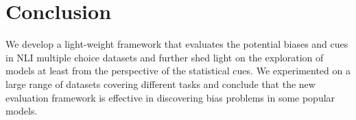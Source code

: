 \section{Conclusion}
We develop a light-weight 
framework that evaluates the potential biases and cues in NLI multiple choice 
datasets and further shed light on
the exploration of models at least from the perspective of the statistical cues. 
We experimented on a large range of datasets covering different tasks and 
conclude that the new evaluation framework is effective in discovering
bias problems in some popular models.
